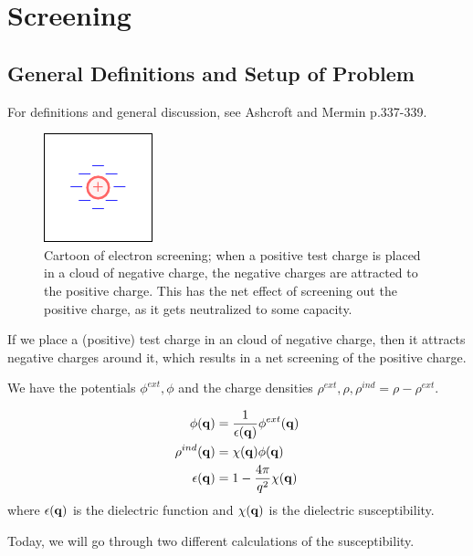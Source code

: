 \section{Screening}
\subsection{General Definitions and Setup of Problem}
For definitions and general discussion, see Ashcroft and Mermin p.337-339.

\begin{figure}[htbp]
    \centering
    \includegraphics[]{Images/fig-screeningcartoon.pdf}
    \caption{Cartoon of electron screening; when a positive test charge is placed in a cloud of negative charge, the negative charges are attracted to the positive charge. This has the net effect of screening out the positive charge, as it gets neutralized to some capacity.}
    \label{fig-screeningcartoon}
\end{figure}
If we place a (positive) test charge in an cloud of negative charge, then it attracts negative charges around it, which results in a net screening of the positive charge. 

We have the potentials $\phi^{ext}, \phi$ and the charge densities $\rho^{ext}, \rho, \rho^{ind} = \rho - \rho^{ext}$. 

\begin{equation}\label{eq-potentialsdielectric}
    \begin{split}
        \phi(\mathbf{q}) &= \frac{1}{\epsilon(\mathbf{q})}\phi^{ext}(\mathbf{q})
        \\ \rho^{ind}(\mathbf{q}) &= \chi(\mathbf{q})\phi(\mathbf{q})
        \\ \epsilon(\mathbf{q}) &= 1 - \frac{4\pi}{q^2}\chi(\mathbf{q})
    \end{split}
\end{equation}
where $\epsilon(\mathbf{q})$ is the dielectric function and $\chi(\mathbf{q})$ is the dielectric susceptibility. 

Today, we will go through two different calculations of the susceptibility.

